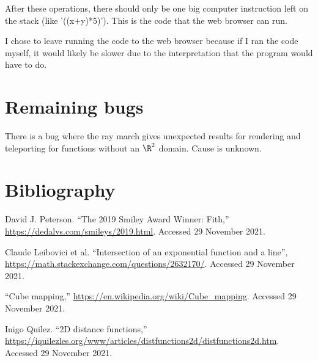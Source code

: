 After these operations, there should only be one big computer instruction left on the stack (like '((x+y)*5)').  This is the code that the web browser can run.

I chose to leave running the code to the web browser because if I ran the code myself, it would likely be slower due to the interpretation that the program would have to do.

\section*{Remaining bugs}

There is a bug where the ray march gives unexpected results for rendering and teleporting for functions without an $\R^2$ domain.  Cause is unknown.

\section*{Bibliography}

David J. Peterson.  ``The 2019 Smiley Award Winner: Fith,'' \url{https://dedalvs.com/smileys/2019.html}.  Accessed 29 November 2021.

Claude Leibovici et al.  ``Intersection of an exponential function and a line'', \url{https://math.stackexchange.com/questions/2632170/}.  Accessed 29 November 2021.

``Cube mapping,'' \url{https://en.wikipedia.org/wiki/Cube_mapping}.  Accessed 29 November 2021.

Inigo Quilez.  ``2D distance functions,'' \url{https://iquilezles.org/www/articles/distfunctions2d/distfunctions2d.htm}.  Accessed 29 November 2021.



